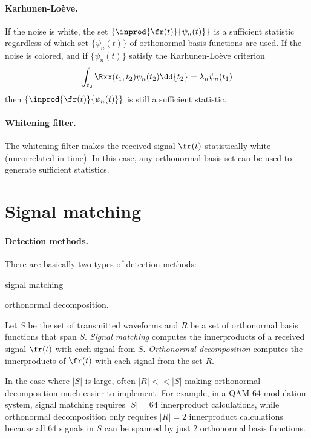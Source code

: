 \paragraph{Karhunen-Lo\`{e}ve.}
If the noise is white, the set $\{\inprod{\fr(t)}{\psi_n(t)}\}$
is a sufficient statistic regardless of which 
set $\{\psi_n(t)\}$ of orthonormal basis functions are used.
If the noise is colored, and if $\{\psi_n(t)\}$ satisfy the 
Karhunen-Lo\`{e}ve criterion
   \[ \int_{t_2}\Rxx(t_1,t_2)\psi_n(t_2)\dd{t_2} = \lambda_n \psi_n(t_1) \]
then $\{\inprod{\fr(t)}{\psi_n(t)}\}$ is still a sufficient statistic.

\paragraph{Whitening filter.}
The whitening filter makes the received signal $\fr(t)$ statistically white 
(uncorrelated in time). In this case, 
any orthonormal basis set can be used to generate sufficient statistics.




\section{Signal matching}
\paragraph{Detection methods.}
There are basically two types of detection methods:
\begin{enume}
   \item signal matching
   \item orthonormal decomposition.
\end{enume}

Let $S$ be the set of transmitted waveforms and
$R$ be a set of orthonormal basis functions that span $S$.
{\em Signal matching} computes the innerproducts of a 
received signal $\fr(t)$ with each signal from $S$.
{\em Orthonormal decomposition} computes the innerproducts of 
$\fr(t)$ with each signal from the set $R$.

In the case where $|S|$ is large, often $|R|<<|S|$
making orthonormal decomposition much easier to implement.
For example, in a QAM-64 modulation system,
signal matching requires $|S|=64$ innerproduct calculations,
while orthonormal decomposition only requires $|R|=2$ 
innerproduct calculations because all 64 signals in $S$ can be spanned 
by just 2 orthonormal basis functions.

